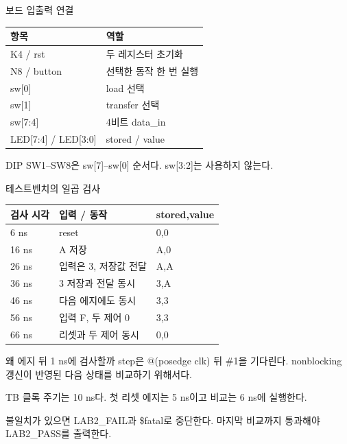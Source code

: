 \begin{frame}{보드 입출력 연결}
\small
\begin{center}\renewcommand{\arraystretch}{1.55}\begin{tabular}{ll}
항목 & 역할\\\hline
K4 / rst & 두 레지스터 초기화\\
N8 / button & 선택한 동작 한 번 실행\\
sw[0] & load 선택\\
sw[1] & transfer 선택\\
sw[7:4] & 4비트 data\_in\\
LED[7:4] / LED[3:0] & stored / value\\
\end{tabular}\end{center}DIP SW1–SW8은 sw[7]–sw[0] 순서다. sw[3:2]는 사용하지 않는다.\par
\end{frame}

\begin{frame}{테스트벤치의 일곱 검사}
\small
\begin{center}\renewcommand{\arraystretch}{1.55}\begin{tabular}{lll}
검사 시각 & 입력 / 동작 & stored,value\\\hline
6 ns & reset & 0,0\\
16 ns & A 저장 & A,0\\
26 ns & 입력은 3, 저장값 전달 & A,A\\
36 ns & 3 저장과 전달 동시 & 3,A\\
46 ns & 다음 에지에도 동시 & 3,3\\
56 ns & 입력 F, 두 제어 0 & 3,3\\
66 ns & 리셋과 두 제어 동시 & 0,0\\
\end{tabular}\end{center}
\end{frame}

\begin{frame}{왜 에지 뒤 1 ns에 검사할까}
\small
step은 @(posedge clk) 뒤 \#1을 기다린다. nonblocking 갱신이 반영된 다음 상태를 비교하기 위해서다.\par\vspace{0.26cm}TB 클록 주기는 10 ns다. 첫 리셋 에지는 5 ns이고 비교는 6 ns에 실행한다.\par\vspace{0.26cm}불일치가 있으면 LAB2\_FAIL과 \$fatal로 중단한다. 마지막 비교까지 통과해야 LAB2\_PASS를 출력한다.\par
\end{frame}

